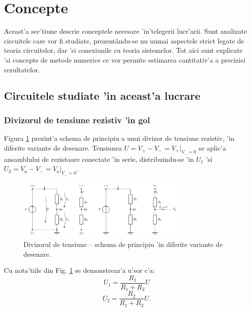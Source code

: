 \section{Concepte}

\begin{summary}
  Aceast'a sec'tiune descrie conceptele necesare 'in'telegerii lucr'arii. Sunt analizate circuitele care vor fi studiate, prezent\^andu-se nu numai aspectele strict legate de teoria circuitelor, dar 'si conexiunile cu teoria sistemelor. Tot aici sunt explicate 'si concepte de metode numerice ce vor permite estimarea cantitativ'a a preciziei rezultatelor.  
\end{summary}

\subsection*{Circuitele studiate 'in aceast'a lucrare}

\subsubsection*{\color{blue} Divizorul de tensiune rezistiv 'in gol}

Figura \ref{fig:divizor_schema} prezint'a schema de principiu a unui divizor de tensiune rezistiv, 'in diferite variante de desenare. Tensiunea $U = V_+ - V_- = V_+|_{V_-=0}$ se aplic'a ansamblului de rezistoare conectate 'in serie, distribuindu-se 'in $U_1$ 'si $U_2=V_a - V_- = V_a|_{V_-=0}$.

\begin{figure}
	\centering
		\includegraphics[width=0.75\textwidth]{laborator_01/figuri/scheme_divizor}
	\caption{Divizorul de tensiune -- schema de principiu 'in diferite variante de desenare.}
	\label{fig:divizor_schema}
\end{figure}

Cu nota'tiile din Fig. \ref{fig:divizor_schema} se demonstreaz'a u'sor c'a:
\begin{equation} \label{eq:tensiune_intrare_gol}
U_1 = \frac{R_1}{R_1+R_2}U
\end{equation}
\begin{equation} \label{eq:tensiune_iesire_gol}
U_2 = \frac{R_2}{R_1+R_2}U.
\end{equation}

